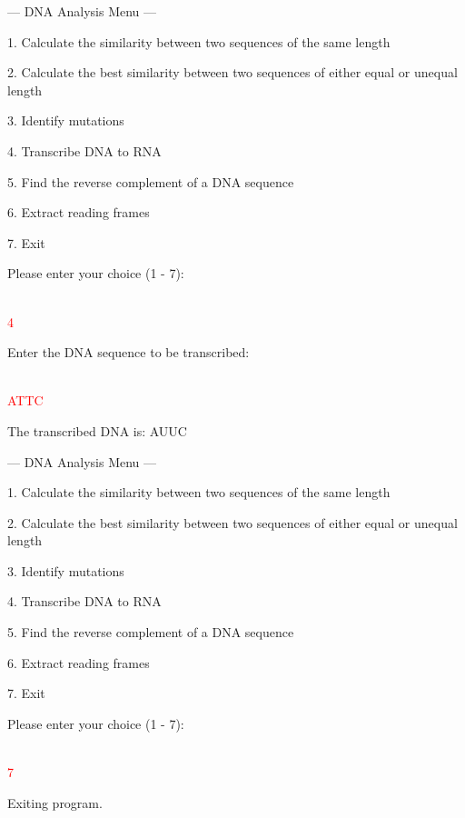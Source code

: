 \begin{sample}

    --- DNA Analysis Menu ---
    
    1. Calculate the similarity between two sequences of the same length
    
    2. Calculate the best similarity between two sequences of either equal or unequal length
    
    3. Identify mutations
    
    4. Transcribe DNA to RNA
    
    5. Find the reverse complement of a DNA sequence
    
    6. Extract reading frames
    
    7. Exit
    
    Please enter your choice (1 - 7): 
    
    \\\textcolor{red}{4}

    Enter the DNA sequence to be transcribed: 

    \\\textcolor{red}{ATTC}

    The transcribed DNA is: AUUC
    
    --- DNA Analysis Menu ---
    
    1. Calculate the similarity between two sequences of the same length
   
    2. Calculate the best similarity between two sequences of either equal or unequal length
    
    3. Identify mutations
    
    4. Transcribe DNA to RNA
    
    5. Find the reverse complement of a DNA sequence
    
    6. Extract reading frames
    
    7. Exit
    
    Please enter your choice (1 - 7): 
    
    \\\textcolor{red}{7}
    
    Exiting program.
\end{sample}


